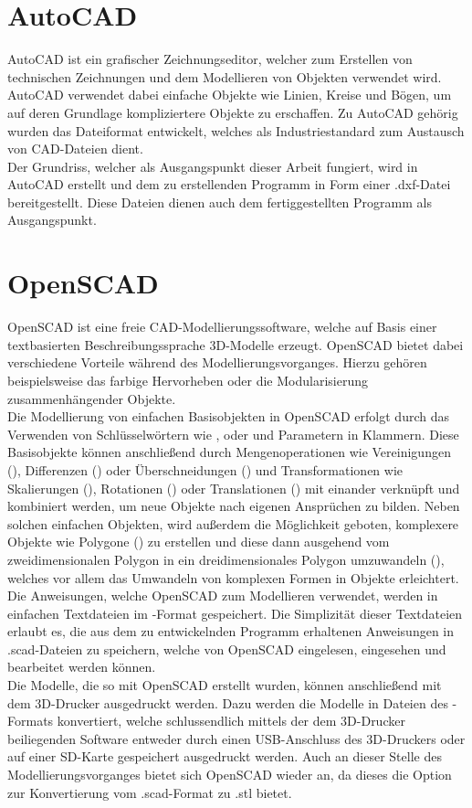 \section{AutoCAD}
AutoCAD ist ein grafischer Zeichnungseditor, welcher zum Erstellen von technischen Zeichnungen und dem Modellieren von Objekten verwendet wird.
AutoCAD verwendet dabei einfache Objekte wie Linien, Kreise und Bögen, um auf deren Grundlage kompliziertere Objekte zu erschaffen.
Zu AutoCAD gehörig wurden das Dateiformat  entwickelt, welches als Industriestandard zum Austausch von CAD-Dateien dient. \\
Der Grundriss, welcher als Ausgangspunkt dieser Arbeit fungiert, wird in AutoCAD erstellt und dem zu erstellenden Programm in Form einer .dxf-Datei bereitgestellt.
Diese Dateien dienen auch dem fertiggestellten Programm als Ausgangspunkt.
\section{OpenSCAD}
OpenSCAD ist eine freie CAD-Modellierungssoftware, welche auf Basis einer textbasierten Beschreibungssprache 3D-Modelle erzeugt.
OpenSCAD bietet dabei verschiedene Vorteile während des Modellierungsvorganges.
Hierzu gehören beispielsweise das farbige Hervorheben oder die Modularisierung zusammenhängender Objekte. \\
Die Modellierung von einfachen Basisobjekten in OpenSCAD erfolgt durch das Verwenden von Schlüsselwörtern wie ,  oder  und Parametern in Klammern.
Diese Basisobjekte können anschließend durch Mengenoperationen wie Vereinigungen (), Differenzen () oder Überschneidungen () und Transformationen wie Skalierungen (), Rotationen () oder Translationen () mit einander verknüpft und kombiniert werden, um neue Objekte nach eigenen Ansprüchen zu bilden.
Neben solchen einfachen Objekten, wird außerdem die Möglichkeit geboten, komplexere Objekte wie Polygone () zu erstellen und diese dann ausgehend vom zweidimensionalen Polygon in ein dreidimensionales Polygon umzuwandeln (), welches vor allem das Umwandeln von komplexen Formen in Objekte erleichtert. \\
Die Anweisungen, welche OpenSCAD zum Modellieren verwendet, werden in einfachen Textdateien im -Format gespeichert.
Die Simplizität dieser Textdateien erlaubt es, die aus dem zu entwickelnden Programm erhaltenen Anweisungen in .scad-Dateien zu speichern, welche von OpenSCAD eingelesen, eingesehen und bearbeitet werden können. \\
Die Modelle, die so mit OpenSCAD erstellt wurden, können anschließend mit dem 3D-Drucker ausgedruckt werden.
Dazu werden die Modelle in Dateien des -Formats konvertiert, welche schlussendlich mittels der dem 3D-Drucker beiliegenden Software entweder durch einen USB-Anschluss des 3D-Druckers oder auf einer SD-Karte gespeichert ausgedruckt werden.
Auch an dieser Stelle des Modellierungsvorganges bietet sich OpenSCAD wieder an, da dieses die Option zur Konvertierung vom .scad-Format zu .stl bietet.
